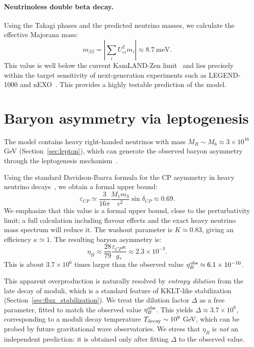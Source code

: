 \documentclass[12pt,a4paper]{article}
\numberwithin{equation}{section}
\begin{document}
\paragraph{Neutrinoless double beta decay.}
Using the Takagi phases and the predicted neutrino masses, we calculate the effective Majorana mass:
\begin{equation}
m_{\beta\beta} = \left| \sum_i U_{ei}^2 m_i \right| \approx 8.7~\text{meV}.
\end{equation}
This value is well below the current KamLAND-Zen limit~\cite{KamLANDZen2023} and lies precisely within the target sensitivity of next-generation experiments such as LEGEND-1000 and nEXO~\cite{LEGEND2024}. This provides a highly testable prediction of the model.

\section{Baryon asymmetry via leptogenesis}
\label{sec:leptogenesis}
The model contains heavy right-handed neutrinos with mass \(M_R \sim M_6 \approx 3 \times 10^{16}\) GeV (Section~\ref{sec:lepton}), which can generate the observed baryon asymmetry through the leptogenesis mechanism~\cite{Fukugita1986}. 

Using the standard Davidson-Ibarra formula for the CP asymmetry in heavy neutrino decays~\cite{DavidsonIbarra2002}, we obtain a formal upper bound:
\begin{equation}
\varepsilon_{CP} \simeq \frac{3}{16\pi} \frac{M_1 m_3}{v^2} \sin\delta_{CP} \approx 0.69.
\end{equation}
We emphasize that this value is a formal upper bound, close to the perturbativity limit; a full calculation including flavour effects and the exact heavy neutrino mass spectrum will reduce it. The washout parameter is \(K \simeq 0.83\), giving an efficiency \(\kappa \simeq 1\). The resulting baryon asymmetry is:
\begin{equation}
\eta_B \approx \frac{28}{79} \frac{\varepsilon_{CP} \kappa}{g_*} \approx 2.3 \times 10^{-3}.
\end{equation}
This is about \(3.7 \times 10^6\) times larger than the observed value \(\eta_B^{\rm obs} \approx 6.1 \times 10^{-10}\). 

This apparent overproduction is naturally resolved by \emph{entropy dilution} from the late decay of moduli, which is a standard feature of KKLT-like stabilization~\cite{KKLT2003} (Section~\ref{sec:flux_stabilization}). We treat the dilution factor \(\Delta\) as a free parameter, fitted to match the observed value $\eta_B^{\rm obs}$. This yields \(\Delta \approx 3.7 \times 10^6\), corresponding to a moduli decay temperature \(T_{\rm decay} \sim 10^9\) GeV, which can be probed by future gravitational wave observatories. We stress that \(\eta_B\) is \emph{not} an independent prediction: it is obtained only after fitting \(\Delta\) to the observed value.
\end{document}
